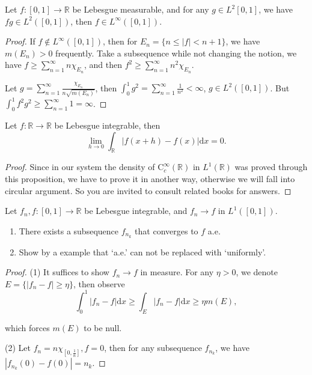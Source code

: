 \begin{problem}
Let $ f\colon[0,1]\to \mathbb{R}  $ be Lebesgue measurable, and for any $ g\in L^{2}[0,1] $, we have $ fg\in L^{2}([0,1]) $, then $ f\in L^{\infty }([0,1]) $.
\end{problem}

\begin{proof}
	If $ f\notin L^{\infty }([0,1]) $, then for $ E_{n}=\{n\le |f|<n+1\} $, we have $ m(E_{n})>0 $ frequently. Take a subsequence while not changing the notion, we have $ f\ge \sum_{n=1}^{\infty}n\chi_{E_{n}} $, and then $ f^{2}\ge \sum_{n=1}^{\infty}n^{2}\chi_{E_{n}} $.
	
	Let $ g=\sum_{n=1}^{\infty}{\frac{\chi _{E_n}}{n\sqrt{m\left( E_n \right)}}} $, then $
	\int_0^1{g^2}=\sum_{n=1}^{\infty}{\frac{1}{n^2}}<\infty 
	$, $ g\in L^{2}([0,1]) $. But $
	\int_0^1{f^2g^2}\ge \sum_{n=1}^{\infty}{1}=\infty 
	$.
\end{proof}

\begin{problem}
Let $ f\colon\mathbb{R} \to \mathbb{R}  $ be Lebesgue integrable, then $$
\lim_{h\rightarrow 0}\int_{\mathbb{R}}^{}{|f( x+h ) -f( x ) |\mathrm{d} x}=0.
$$
\end{problem}

\begin{proof}

	Since in our system the density of $\mathrm{C}_c^\infty(\mathbb{R})$ in $L^1(\mathbb{R})$ was proved through this proposition, we have to prove it in another way, otherwise we will fall into circular argument. So you are invited to consult related books for answers.
\end{proof}

\begin{problem}
Let $ f_{n},f \colon[0,1]\to \mathbb{R}  $ be Lebesgue integrable, and $ f_{n}\to f $ in $ L^{1}([0,1]) $.
\begin{enumerate}
\item There exists a subsequence $ f_{n_{k}} $ that converges to $ f $ a.e.
\item Show by a example that `a.e.' can not be replaced with `uniformly'.
\end{enumerate}
\end{problem}

\begin{proof}
	(1) It suffices to show $ f_{n}\to f $ in measure. For any $ \eta>0 $, we denote $ E=\{|f_{n}-f|\ge\eta \} $, then observe
	$$
	\int_0^1{|f_n-f|\mathrm{d} x}\ge \int_E^{}{|f_n-f|\mathrm{d} x}\ge \eta m( E ), 
	$$
	
	which forces $ m(E) $ to be null.
	
	(2) Let $
	f_n=n\chi _{[ 0,\frac{1}{n} ]},f=0
	$, then for any subsequence $ f_{n_{k}} $, we have $
	|f_{n_{k}}( 0 ) -f( 0 ) |=n_{k}
	$.
\end{proof}

